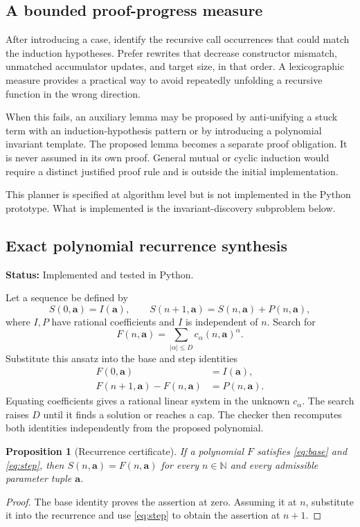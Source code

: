 \documentclass[11pt,a4paper]{article}
\newtheorem{proposition}{Proposition}[section]
\theoremstyle{definition}
\newcommand{\N}{\mathbb{N}}
\newcommand{\status}[1]{\textbf{Status:} #1.}
\begin{document}
\subsection{A bounded proof-progress measure}

After introducing a case, identify the recursive call occurrences that could match the induction hypotheses. Prefer rewrites that decrease constructor mismatch, unmatched accumulator updates, and target size, in that order. A lexicographic measure provides a practical way to avoid repeatedly unfolding a recursive function in the wrong direction.

When this fails, an auxiliary lemma may be proposed by anti-unifying a stuck term with an induction-hypothesis pattern or by introducing a polynomial invariant template. The proposed lemma becomes a separate proof obligation. It is never assumed in its own proof. General mutual or cyclic induction would require a distinct justified proof rule and is outside the initial implementation.

This planner is specified at algorithm level but is not implemented in the Python prototype. What is implemented is the invariant-discovery subproblem below.

\subsection{Exact polynomial recurrence synthesis}
\status{Implemented and tested in Python}

Let a sequence be defined by
\[
 S(0,\bm a)=I(\bm a),\qquad
 S(n+1,\bm a)=S(n,\bm a)+P(n,\bm a),
\]
where $I,P$ have rational coefficients and $I$ is independent of $n$. Search for
\[
 F(n,\bm a)=\sum_{|\alpha|\le D}c_\alpha(n,\bm a)^\alpha.
\]
Substitute this ansatz into the base and step identities
\begin{align}
 F(0,\bm a)&=I(\bm a),\label{eq:base}\\
 F(n+1,\bm a)-F(n,\bm a)&=P(n,\bm a).\label{eq:step}
\end{align}
Equating coefficients gives a rational linear system in the unknown $c_\alpha$. The search raises $D$ until it finds a solution or reaches a cap. The checker then recomputes both identities independently from the proposed polynomial.

\begin{proposition}[Recurrence certificate]
If a polynomial $F$ satisfies \eqref{eq:base} and \eqref{eq:step}, then $S(n,\bm a)=F(n,\bm a)$ for every $n\in\N$ and every admissible parameter tuple $\bm a$.
\end{proposition}
\begin{proof}
The base identity proves the assertion at zero. Assuming it at $n$, substitute it into the recurrence and use \eqref{eq:step} to obtain the assertion at $n+1$.
\end{proof}
\end{document}
